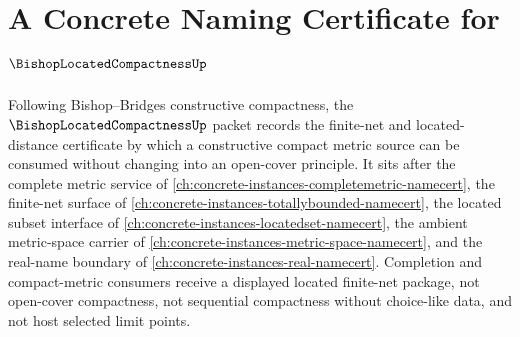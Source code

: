 \chapter{A Concrete Naming Certificate for $\BishopLocatedCompactnessUp$}
\label{ch:concrete-instances-bishop-located-compactness-namecert}

Following Bishop--Bridges constructive compactness, the $\BishopLocatedCompactnessUp$ packet records the finite-net and located-distance certificate by which a constructive compact metric source can be consumed without changing into an open-cover principle. It sits after the complete metric service of \autoref{ch:concrete-instances-completemetric-namecert}, the finite-net surface of \autoref{ch:concrete-instances-totallybounded-namecert}, the located subset interface of \autoref{ch:concrete-instances-locatedset-namecert}, the ambient metric-space carrier of \autoref{ch:concrete-instances-metric-space-namecert}, and the real-name boundary of \autoref{ch:concrete-instances-real-namecert}. Completion and compact-metric consumers receive a displayed located finite-net package, not open-cover compactness, not sequential compactness without choice-like data, and not host selected limit points.

